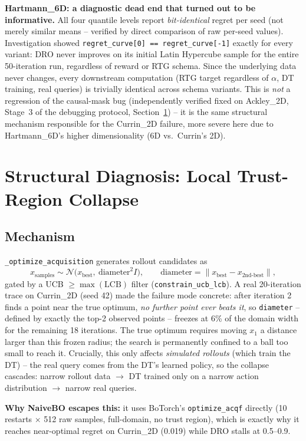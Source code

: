 \documentclass[11pt]{article}
\begin{document}
\textbf{Hartmann\_6D: a diagnostic dead end that turned out to be informative.}
All four quantile levels report \emph{bit-identical} regret per seed (not
merely similar means -- verified by direct comparison of raw per-seed values).
Investigation showed \texttt{regret\_curve[0] == regret\_curve[-1]} exactly for
every variant: DRO never improves on its initial Latin Hypercube sample for the
entire 50-iteration run, regardless of reward or RTG schema. Since the
underlying data never changes, every downstream computation (RTG target
regardless of $\alpha$, DT training, real queries) is trivially identical
across schema variants. This is \emph{not} a regression of the causal-mask bug
(independently verified fixed on Ackley\_2D, Stage~3 of the debugging protocol,
Section~\ref{sec:diagnosis}) -- it is the same structural mechanism responsible
for the Currin\_2D failure, more severe here due to Hartmann\_6D's higher
dimensionality (6D vs.\ Currin's 2D).

\FloatBarrier
\section{Structural Diagnosis: Local Trust-Region Collapse}
\label{sec:diagnosis}

\subsection{Mechanism}

\texttt{\_optimize\_acquisition} generates rollout candidates as
\[
x_{\text{samples}} \sim \mathcal{N}\big(x_{\text{best}},\ \text{diameter}^2 I\big), \qquad
\text{diameter} = \lVert x_{\text{best}} - x_{\text{2nd-best}} \rVert,
\]
gated by a UCB $\geq \max(\text{LCB})$ filter (\texttt{constrain\_ucb\_lcb}).
A real 20-iteration trace on Currin\_2D (seed 42) made the failure mode
concrete: after iteration 2 finds a point near the true optimum, \emph{no
further point ever beats it}, so \texttt{diameter} -- defined by exactly the
top-2 observed points -- freezes at 6\% of the domain width for the remaining
18 iterations. The true optimum requires moving $x_1$ a distance larger than
this frozen radius; the search is permanently confined to a ball too small to
reach it. Crucially, this only affects \emph{simulated rollouts} (which train
the DT) -- the real query comes from the DT's learned policy, so the collapse
cascades: narrow rollout data $\to$ DT trained only on a narrow action
distribution $\to$ narrow real queries.

\textbf{Why NaiveBO escapes this:} it uses BoTorch's \texttt{optimize\_acqf}
directly (10 restarts $\times$ 512 raw samples, full-domain, no trust region),
which is exactly why it reaches near-optimal regret on Currin\_2D
(0.019) while DRO stalls at 0.5--0.9.
\end{document}
